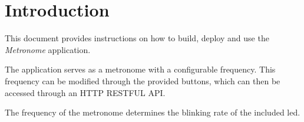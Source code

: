 \chapter{Introduction}

This document provides instructions on how to build, deploy and use the \textit{Metronome} application.

The application serves as a metronome with a configurable frequency. This frequency can be modified through the provided buttons, which can then be accessed through an HTTP RESTFUL API.

The frequency of the metronome determines the blinking rate of the included led.
